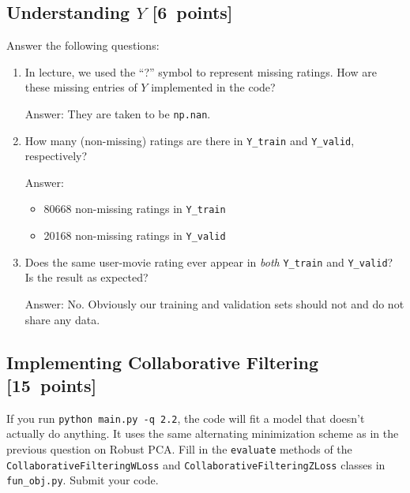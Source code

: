 \documentclass{article}
\newcommand{\blu}[1]{{\textcolor{blu}{#1}}}
\newenvironment{answer}{\par\begingroup\color{gre}Answer: }{\endgroup}
\let\ask\blu
\newcommand\pts[1]{\textcolor{pointscolour}{[#1~points]}}
\begin{document}
\subsection{Understanding $Y$ \pts{6}}

\ask{Answer the following questions:}

\begin{enumerate}
\item In lecture, we used the ``?'' symbol to represent missing ratings. How are these missing entries of $Y$ implemented in the code?
\begin{answer}
    They are taken to be \texttt{np.nan}.
\end{answer}

\item How many (non-missing) ratings are there in \texttt{Y\_train} and \texttt{Y\_valid}, respectively?
\begin{answer}
    \begin{itemize}
        \item 80668 non-missing ratings in \texttt{Y\_train}
        \item 20168 non-missing ratings in \texttt{Y\_valid}
    \end{itemize}
\end{answer}

\item Does the same user-movie rating ever appear in \emph{both} \texttt{Y\_train} and \texttt{Y\_valid}? Is the result as expected?
\begin{answer}
    No. Obviously our training and validation sets should not and do not share any data.
\end{answer}
\end{enumerate}


\subsection{Implementing Collaborative Filtering \pts{15}}

If you run \texttt{python main.py -q 2.2}, the code will fit a model that doesn't actually do anything. It uses the same alternating minimization scheme as in the previous question on Robust PCA. \ask{Fill in the \texttt{evaluate} methods of the \texttt{CollaborativeFilteringWLoss} and \texttt{CollaborativeFilteringZLoss} classes in \texttt{fun\_obj.py}. Submit your code.}
\end{document}
